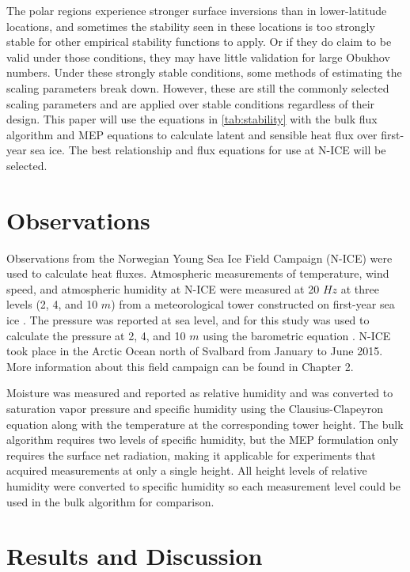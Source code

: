 The polar regions experience stronger surface inversions than in lower-latitude locations, and sometimes the stability seen in these locations is too strongly stable for other empirical stability functions to apply. Or if they do claim to be valid under those conditions, they may have little validation for large Obukhov numbers. Under these strongly stable conditions, some methods of estimating the scaling parameters break down. However, these are still the commonly selected scaling parameters and are applied over stable conditions regardless of their design. This paper will use the equations in \ref{tab:stability} with the bulk flux algorithm and MEP equations to calculate latent and sensible heat flux over first-year sea ice. The best relationship and flux equations for use at N-ICE will be selected. 

\section{Observations}
Observations from the Norwegian Young Sea Ice Field Campaign (N-ICE) were used to calculate heat fluxes. Atmospheric measurements of temperature, wind speed, and atmospheric humidity at N-ICE were measured at 20 $Hz$ at three levels (2, 4, and 10 $m$) from a meteorological tower constructed on first-year sea ice \citep{walden:2017}. The pressure was reported at sea level, and for this study was used to calculate the pressure at 2, 4, and 10 $m$ using the barometric equation \citep{lente:2020}. N-ICE took place in the Arctic Ocean north of Svalbard from January to June 2015. More information about this field campaign can be found in Chapter 2.
 
 Moisture was measured and reported as relative humidity and was converted to saturation vapor pressure and specific humidity using the Clausius-Clapeyron equation \citep{iribarne:1981} along with the temperature at the corresponding tower height. The bulk algorithm requires two levels of specific humidity, but the MEP formulation only requires the surface net radiation, making it applicable for experiments that acquired measurements at only a single height. All height levels of relative humidity were converted to specific humidity so each measurement level could be used in the bulk algorithm for comparison. 

\section{Results and Discussion}
